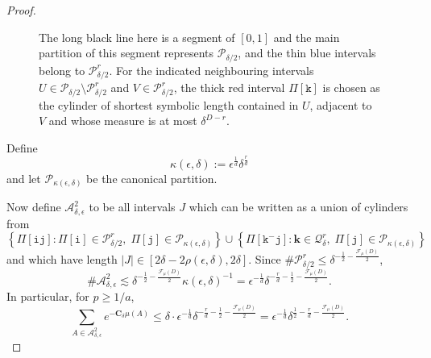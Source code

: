 \documentclass[11pt, reqno]{amsart}
\numberwithin{equation}{section}
\theoremstyle{plain}%
\theoremstyle{definition}
\def\F{\ensuremath{\mathcal F}}
\def\A{\ensuremath{\mathscr A}}
\def\sm{\setminus}
\renewcommand{\i}{\mathtt{i}}
\renewcommand{\j}{\mathtt{j}}
\renewcommand{\k}{\mathtt{k}}
\renewcommand{\A}{\mathcal{A}}
\renewcommand{\F}{\mathcal{F}}
\theoremstyle{nonumberplain}
\begin{document}
\begin{proof}
\begin{figure}[h]
  \caption{The long black line here is a segment of $[0, 1]$ and the main partition of this segment represents $\mathscr{P}_{\delta/2}$, and the thin blue intervals belong to $\mathscr{P}_{\delta/2}^r$. For the indicated neighbouring intervals $U\in \mathscr{P}_{\delta/2}\sm \mathscr{P}_{\delta/2}^r$ and $V\in \mathscr{P}_{\delta/2}^r$, the thick red interval $\Pi[\k]$ is chosen as the cylinder of shortest symbolic length contained in $U$, adjacent to $V$ and whose measure is at most $\delta^{D-r}$.}
    \label{fig:k}
\end{figure}

Define 
$$\kappa(\epsilon,\delta):=\epsilon^{\frac{1}{d}}\delta^{\frac{r}{d}}$$
and let $\mathscr{P}_{\kappa(\epsilon,\delta)}$ be the canonical partition.

Now define $\A^2_{\delta,\epsilon}$ to be all intervals $J$ which can be written as a union of cylinders from  
\begin{equation}\label{weirdset}
 \left\{\Pi[\i\j]: \Pi[\i] \in \mathscr{P}_{\delta/2}^r, \;\Pi[\j ]\in \mathscr{P}_{\kappa(\epsilon,\delta)}\right\} \cup \left\{\Pi[\k^-\j]: \mathbf{k} \in \mathcal{Q}_{\delta}^r,\; \Pi[\j] \in \mathscr{P}_{\kappa(\epsilon,\delta)}\right\}
\end{equation}
and which have length $|J| \in [2\delta-2\rho(\epsilon,\delta), 2\delta]$. Since $\#\mathscr{P}_{\delta/2}^r \leq\delta^{-\frac{1}{2}-\frac{\F_\mu(D)}{2}}$,
$$\#\A^2_{\delta,\epsilon} \lesssim\delta^{-\frac{1}{2}-\frac{\F_\mu(D)}{2}}\kappa(\epsilon,\delta)^{-1}=\epsilon^{-\frac{1}{d}} \delta^{-\frac{r}{d}-\frac{1}{2}-\frac{\F_\mu(D)}{2}}.$$
In particular, for $p\ge 1/a$, 
$$\sum_{A \in \A^2_{\delta,\epsilon}} e^{-\mathbf{C}_\delta \mu(A)} \leq\delta \cdot\epsilon^{-\frac{1}{d}} \delta^{-\frac{r}{d}-\frac{1}{2}-\frac{\F_\mu(D)}{2}}=\epsilon^{-\frac{1}{d}} \delta^{\frac{1}{2}-\frac{r}{d}-\frac{\F_\mu(D)}{2}}.$$


\end{proof}
\end{document}
